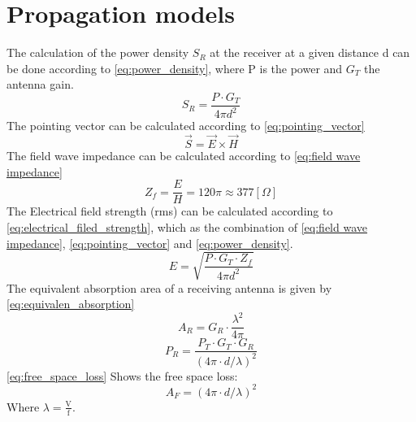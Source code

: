 \section{Propagation models}
The calculation of the power density $S_R$ at the receiver at a given distance d can be done according to \autoref{eq:power_density}, where P is the power and $G_T$ the antenna gain.
\begin{equation}\label{eq:power_density}
    S_R=\frac{P \cdot G_T}{4 \pi d^2}
\end{equation}
The pointing vector can be calculated according to \autoref{eq:pointing_vector}
\begin{equation}\label{eq:pointing_vector}
    \vec{S}=\vec{E} \times \vec{H}
\end{equation}
The field wave impedance can be calculated according to \autoref{eq:field wave impedance}
\begin{equation}\label{eq:field wave impedance}
    Z_f=\frac{E}{H}=120 \pi \approx 377[\Omega]
\end{equation}
The Electrical field strength (rms) can be calculated according to \autoref{eq:electrical_filed_strength}, which as the combination of \autoref{eq:field wave impedance}, \autoref{eq:pointing_vector} and \autoref{eq:power_density}.
\begin{equation}\label{eq:electrical_filed_strength}
E=\sqrt{\frac{P \cdot G_T \cdot Z_f}{4 \pi d^2}}
\end{equation}
The equivalent absorption area of a receiving antenna is given by \autoref{eq:equivalen_absorption}
\begin{equation}\label{eq:equivalen_absorption}
    A_R=G_R \cdot \frac{\lambda^2}{4 \pi}
\end{equation}
\begin{equation}
P_R=\frac{P_T \cdot G_T \cdot G_R}{(4 \pi \cdot d / \lambda)^2}
\end{equation}
\autoref{eq:free_space_loss} Shows the free space loss:
\begin{equation}\label{eq:free_space_loss}
A_F=(4 \pi \cdot d / \lambda)^2
\end{equation}
Where $\lambda=\frac{\mathrm{V}}{\mathrm{f}}$.

